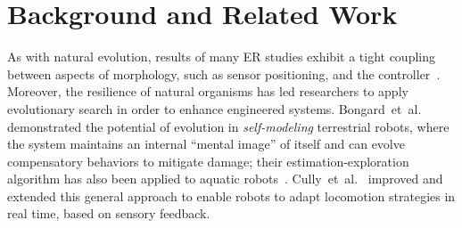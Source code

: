 \section{Background and Related Work}
\label{s:background}
 






%
%
%
As with natural evolution, results of many ER studies exhibit a tight coupling between
aspects of morphology, such as sensor positioning, and the controller~\cite{Bongard2015}.
Moreover, the resilience of natural organisms has led researchers to 
apply evolutionary search in order to enhance engineered systems.
Bongard~et~al.~\cite{bongard-lipson} demonstrated the potential of evolution
in {\em self-modeling} terrestrial robots, where the system maintains an internal
``mental image'' of itself and can evolve compensatory behaviors to mitigate damage;
their estimation-exploration algorithm has also been applied to aquatic robots~\cite{Rose.SelfModeling.ERLARS.2013}.
Cully~et~al.~\cite{Cully2014} improved and extended this general approach to
enable robots to adapt locomotion strategies in real time, based on sensory feedback.
%


